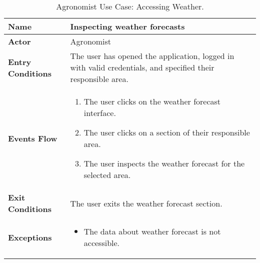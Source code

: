 \begin{table}[hbt!]
\centering
\small
\caption{\label{tab:agrWeather} Agronomist Use Case: Accessing Weather.}
\renewcommand{\arraystretch}{1.25}
\begin{tabular}{|l|>{\raggedright\arraybackslash}m{12cm}|}
    \hline
    \textbf{Name} & Inspecting weather forecasts\\
    \hline
   	\textbf{Actor} & Agronomist\\
    \hline
    \textbf{Entry Conditions} & The user has opened the application, logged in with valid credentials, and specified their responsible area.\\    
    \hline
    \textbf{Events Flow} & 
    	\begin{enumerate}
            \item The user clicks on the weather forecast interface.
            \item The user clicks on a section of their responsible area.
            \item The user inspects the weather forecast for the selected area.
       \end{enumerate}\\
    \hline
    \textbf{Exit Conditions} & The user exits the weather forecast section.\\
    \hline
    \textbf{Exceptions} & 
    	\begin{itemize}
	    	\item The data about weather forecast is not accessible.
    	\end{itemize}\\
    \hline 
\end{tabular}
\end{table}
